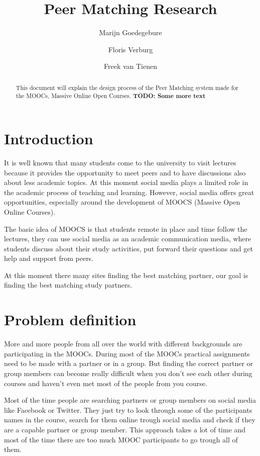 \documentclass[]{article}
\title{Peer Matching Research}
\author{Marijn Goedegebure \and
	Floris Verburg \and
	Freek van Tienen}
\date{}
\newcommand{\TODO}[1]{{\color{red}\textbf{TODO: #1}}}
\begin{document}
\maketitle

\begin{abstract}
This document will explain the design process of the Peer Matching system made for the MOOCs, Massive Online Open Courses.
\TODO{Some more text}
\end{abstract}

\newpage

\tableofcontents

\newpage

\section{Introduction}
It is well known that many students come to the university to visit lectures because it provides the opportunity to meet peers and to have discussions also about less academic topics.
At this moment social media plays a limited role in the academic process of teaching and learning. However, social media offers great opportunities, especially around the development of MOOCS (Massive Open Online Courses).

The basic idea of MOOCS is that students remote in place and time follow the lectures, they can use social media as an academic communication media, where students discuss about their study activities, put forward their questions and get help and support from peers. 

At this moment there many sites finding the best matching partner, our goal is finding the best matching study partners.

\section{Problem definition}
More and more people from all over the world with different backgrounds are participating in the MOOCs.
During most of the MOOCs practical assignments need to be made with a partner or in a group.
But finding the correct partner or group members can become really difficult when you don't see each other during courses and haven't even met most of the people from you course.

Most of the time people are searching partners or group members on social media like Facebook or Twitter.
They just try to look through some of the participants names in the course, search for them online trough social media and check if they are a capable partner or group member.
This approach takes a lot of time and most of the time there are too much MOOC participants to go trough all of them.
\end{document}
